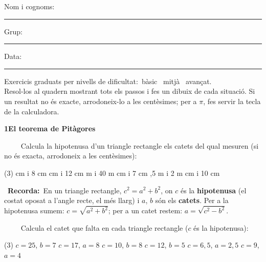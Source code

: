 \documentclass[11pt,a4paper]{article}
\newcommand{\estrelles}[1]{{\color{accent}\ifcase#1\or\faStar\faStar[regular]\faStar[regular]\or\faStar\faStar\faStar[regular]\or\faStar\faStar\faStar\fi}}
\newcounter{exer}
\newcommand{\ex}[1]{\par\needspace{4\baselineskip}\medskip\stepcounter{exer}\noindent{\color{navy}\bfseries\theexer.}\ \ {\small\estrelles{#1}}\ \ }
\newcommand{\seccio}[2]{\par\needspace{10\baselineskip}\bigskip
  \begin{tcolorbox}[colback=navy,colframe=navy,coltext=white,arc=2mm,boxrule=0pt,left=3mm,right=3mm,top=1.2mm,bottom=1.2mm]
  {\large\bfseries #1\quad #2}
  \end{tcolorbox}\vspace{-2pt}}
\newcommand{\recorda}[1]{\par\smallskip\begin{tcolorbox}[colback=accent!7,colframe=accent!55,arc=2mm,boxrule=0.5pt,left=2.5mm,right=2.5mm,top=1mm,bottom=1mm]\small{\color{accent}\faLightbulb[regular]}\ \textbf{Recorda:}\ #1\end{tcolorbox}}
\begin{document}
\thispagestyle{primera}

\vspace{10pt}
Nom i cognoms: \rule{8.4cm}{0.4pt}\hfill Grup: \rule{1.6cm}{0.4pt}\hfill Data: \rule{2.2cm}{0.4pt}
\vspace{8pt}

\begin{tcolorbox}[colback=soft,colframe=soft,arc=2mm,left=3mm,right=3mm,top=1.5mm,bottom=1.5mm]
\small Exercicis graduats per nivells de dificultat:\quad \estrelles{1}\ bàsic \qquad \estrelles{2}\ mitjà \qquad \estrelles{3}\ avançat.\\[2pt] Resol-los al quadern mostrant tots els passos i fes un dibuix de cada situació. Si un resultat no és exacte, arrodoneix-lo a les centèsimes; per a $\pi$, fes servir la tecla de la calculadora.
\end{tcolorbox}

\seccio{1}{El teorema de Pitàgores}

\ex{1} Calcula la hipotenusa d'un triangle rectangle els catets del qual mesuren (si no és exacta, arrodoneix a les centèsimes):\begin{tasks}(3)
   cm i 8 cm
   cm i 12 cm
   m i 40 m
   cm i 7 cm
  ,5 m i 2 m
   cm i 10 cm
\end{tasks}\recorda{En un triangle rectangle, $c^2=a^2+b^2$, on $c$ és la \textbf{hipotenusa} (el costat oposat a l'angle recte, el més llarg) i $a$, $b$ són els \textbf{catets}. Per a la hipotenusa sumem: $c=\sqrt{a^2+b^2}$; per a un catet restem: $a=\sqrt{c^2-b^2}$.}

\ex{1} Calcula el catet que falta en cada triangle rectangle ($c$ és la hipotenusa):\begin{tasks}(3)
  \task $c=25$, $b=7$
  \task $c=17$, $a=8$
  \task $c=10$, $b=8$
  \task $c=12$, $b=5$
  \task $c=6{,}5$, $a=2{,}5$
  \task $c=9$, $a=4$
\end{tasks}
\end{document}
